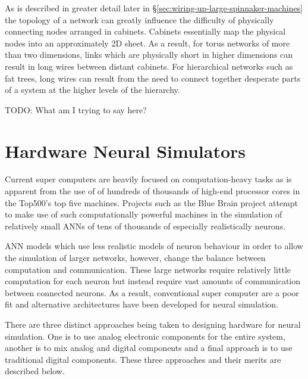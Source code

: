 			As is described in greater detail later in
			\S\ref{sec:wiring-up-large-spinnaker-machines} the topology of a network
			can greatly influence the difficulty of physically connecting nodes
			arranged in cabinets. Cabinets essentially map the physical nodes into an
			approximately 2D sheet. As a result, for torus networks of more than two
			dimensions, links which are physically short in higher dimensions can
			result in long wires between distant cabinets. For hierarchical networks
			such as fat trees, long wires can result from the need to connect together
			desperate parts of a system at the higher levels of the hierarchy.
			
			TODO: What am I trying to say here?
			
	
	\section{Hardware Neural Simulators}
		
		
		Current super computers are heavily focused on computation-heavy tasks as is
		apparent from the use of of hundreds of thousands of high-end processor
		cores in the Top500's top five machines. Projects such as the Blue Brain
		project \cite{markram06} attempt to make use of such computationally
		powerful machines in the simulation of relatively small ANNs of tens of
		thousands of especially realistically neurons.
		
		ANN models which use less realistic models of neuron behaviour in order to
		allow the simulation of larger networks, however, change the balance between
		computation and communication. These large networks require relatively
		little computation for each neuron but instead require vast amounts of
		communication between connected neurons. As a result, conventional super
		computer are a poor fit and alternative architectures have been developed
		for neural simulation.
		
		There are three distinct approaches being taken to designing hardware for
		neural simulation. One is to use analog electronic components for the
		entire system, another is to mix analog and digital components and a final
		approach is to use traditional digital components. These three approaches
		and their merits are described below.
		
